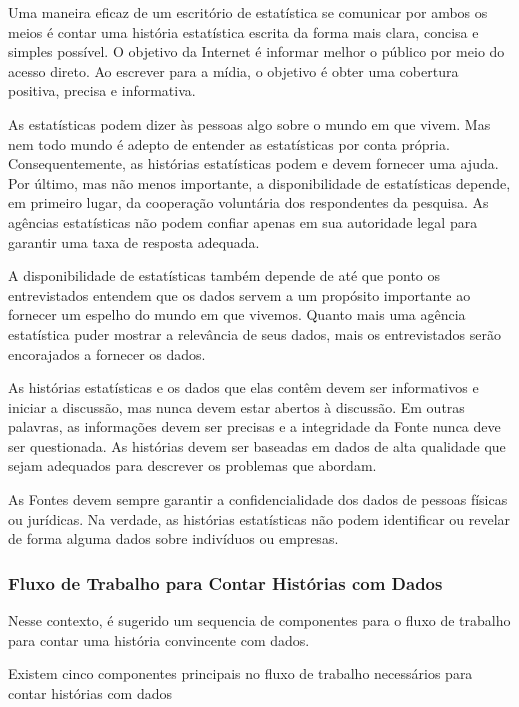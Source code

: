 Uma maneira eficaz de um escritório de estatística se comunicar por ambos os meios é contar uma história estatística escrita da forma mais clara, concisa e simples possível. O objetivo da Internet é informar melhor o público por meio do acesso direto. Ao escrever para a mídia, o objetivo é obter uma cobertura positiva, precisa e informativa.\vskip0.3cm 

As estatísticas podem dizer às pessoas algo sobre o mundo em que vivem. Mas nem todo mundo é adepto de entender as estatísticas por conta própria. Consequentemente, as histórias estatísticas podem e devem fornecer uma ajuda.
Por último, mas não menos importante, a disponibilidade de estatísticas depende, em primeiro lugar, da cooperação voluntária dos respondentes da pesquisa. As agências estatísticas não podem confiar apenas em sua autoridade legal para garantir uma taxa de resposta adequada.\vskip0.3cm 


A disponibilidade de estatísticas também depende de até que ponto os entrevistados entendem que os dados servem a um propósito importante ao fornecer um espelho do mundo em que vivemos. Quanto mais uma agência estatística puder mostrar a relevância de seus dados, mais os entrevistados serão encorajados a fornecer os dados.\vskip0.3cm 

 As histórias estatísticas e os dados que elas contêm devem ser informativos e iniciar a discussão, mas nunca devem estar abertos à discussão. Em outras palavras, as informações devem ser precisas e a integridade da Fonte nunca deve ser questionada. As histórias devem ser baseadas em dados de alta qualidade que sejam adequados para descrever os problemas que abordam.\vskip0.3cm 


 As Fontes devem sempre garantir a confidencialidade dos dados de pessoas físicas ou jurídicas. Na verdade, as histórias estatísticas não podem identificar ou revelar de forma alguma dados sobre indivíduos ou empresas.\vskip0.3cm 

\subsubsection{Fluxo de Trabalho para Contar Histórias com Dados}

Nesse contexto, é sugerido um sequencia de componentes para o fluxo de trabalho para contar uma história convincente com dados.\vskip0.3cm

Existem cinco componentes principais no fluxo de trabalho necessários para contar histórias com dados

